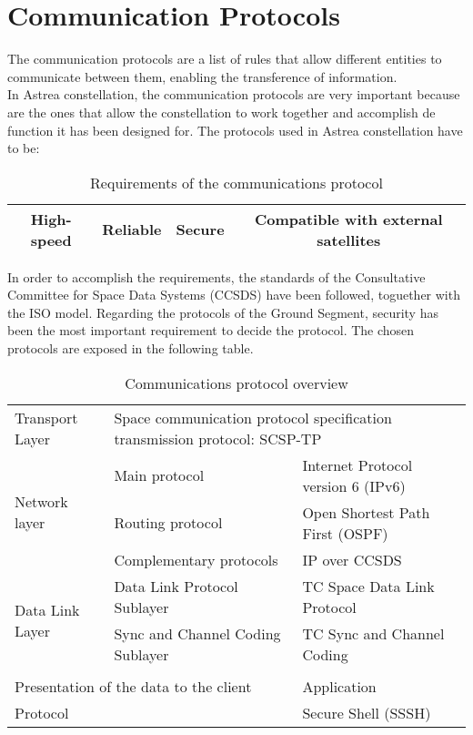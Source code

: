 \section{Communication Protocols}
The communication protocols are a list of rules that allow different entities to communicate between them, enabling the transference of information.\\
In Astrea constellation, the communication protocols are very important because are the ones that allow the constellation to work together and accomplish de function it has been designed for. The protocols used in Astrea constellation have to be: 
\begin{table}[H]
\begin{center}
\begin{tabular}{|c|c|c|c|}
\hline
\rowcolor{blue} High-speed & Reliable &Secure&Compatible with external satellites\\
\hline
\end{tabular}
\caption{Requirements of the communications protocol}
\end{center}
\end{table}
In order to accomplish the requirements, the standards of the Consultative Committee for Space Data Systems (CCSDS) have been followed, toguether with the ISO model. Regarding the protocols of the Ground Segment, security has been the most important requirement to decide the protocol. The chosen protocols are exposed in the following table.
\begin{table}[H]
\begin{center}
\begin{tabular}{|l|l|l|}
\hline
\rowcolor{blue} \multicolumn{3}{|c|}{\textbf{Space segment: CCSDS Standards}}\\
\hline
Transport Layer&\multicolumn{2}{|l|}{Space communication protocol specification transmission protocol: SCSP-TP}\\
\hline
\multirow{3}{*}{Network layer}&Main protocol&Internet Protocol version 6 (IPv6)\\
&Routing protocol&Open Shortest Path First (OSPF)\\
&Complementary protocols&IP over CCSDS\\
\hline
\multirow{2}{*}{Data Link Layer}&Data Link Protocol Sublayer&TC Space Data Link Protocol\\
&Sync and Channel Coding Sublayer&TC Sync and Channel Coding\\
\hline
\rowcolor{blue} \multicolumn{3}{|c|}{\textbf{Ground segment}}\\
\hline
\multicolumn{2}{|l|}{Presentation of the data to the client}&Application\\
\hline
\multicolumn{2}{|l|}{Protocol}&Secure Shell (SSSH)\\
\hline
\end{tabular}
\caption{Communications protocol overview}
\end{center}
\end{table}
